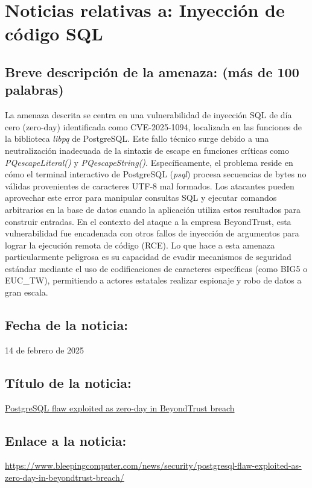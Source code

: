 \chapter{Noticias relativas a: Inyección de código SQL}

    \section{Breve descripción de la amenaza: (más de 100 palabras)}
    La amenaza descrita se centra en una vulnerabilidad de inyección SQL de día cero (zero-day) identificada como CVE-2025-1094, localizada en las funciones de la biblioteca \textit{libpq} de PostgreSQL. Este fallo técnico surge debido a una neutralización inadecuada de la sintaxis de escape en funciones críticas como \textit{PQescapeLiteral()} y \textit{PQescapeString()}. Específicamente, el problema reside en cómo el terminal interactivo de PostgreSQL (\textit{psql}) procesa secuencias de bytes no válidas provenientes de caracteres UTF-8 mal formados. Los atacantes pueden aprovechar este error para manipular consultas SQL y ejecutar comandos arbitrarios en la base de datos cuando la aplicación utiliza estos resultados para construir entradas. En el contexto del ataque a la empresa BeyondTrust, esta vulnerabilidad fue encadenada con otros fallos de inyección de argumentos para lograr la ejecución remota de código (RCE). Lo que hace a esta amenaza particularmente peligrosa es su capacidad de evadir mecanismos de seguridad estándar mediante el uso de codificaciones de caracteres específicas (como BIG5 o EUC\_TW), permitiendo a actores estatales realizar espionaje y robo de datos a gran escala.

    \section{Fecha de la noticia:}
    14 de febrero de 2025
   
    \section{Título de la noticia:}
    \href{https://www.bleepingcomputer.com/news/security/postgresql-flaw-exploited-as-zero-day-in-beyondtrust-breach/}{PostgreSQL flaw exploited as zero-day in BeyondTrust breach}

    \section{Enlace a la noticia:}
    \href{https://www.bleepingcomputer.com/news/security/postgresql-flaw-exploited-as-zero-day-in-beyondtrust-breach/}{https://www.bleepingcomputer.com/news/security/postgresql-flaw-exploited-as-zero-day-in-beyondtrust-breach/}

